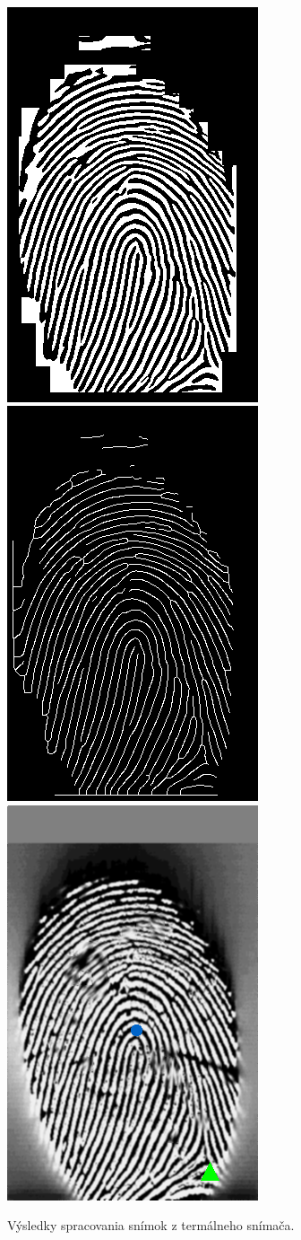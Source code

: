 \begin{figure}[h]
    \\[1pt]
    \includegraphics[width=0.25\linewidth]{obrazky-figures/eval_results/termal_gabor.png}\hspace{0.02\linewidth}
    \includegraphics[width=0.25\linewidth]{obrazky-figures/eval_results/termal_thin.png}\hspace{0.02\linewidth}
    \includegraphics[width=0.25\linewidth]{obrazky-figures/eval_results/termal_singularities.png}
    \caption{Výsledky spracovania snímok z termálneho snímača.}
    \label{obr:vyhodnotenie_termal}
  \end{figure}

